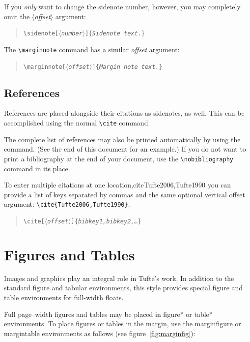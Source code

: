 \documentclass{tufte-handout}
\newcommand{\doccmd}[1]{\texttt{\textbackslash#1}}%
\newcommand{\docopt}[1]{\ensuremath{\langle}\textrm{\textit{#1}}\ensuremath{\rangle}}%
\newcommand{\docarg}[1]{\textrm{\textit{#1}}}%
\newenvironment{docspec}{\begin{quote}\noindent}{\end{quote}}%
\newcommand{\docenv}[1]{\textsf{#1}}%
\begin{document}
If you \emph{only} want to change the sidenote number, however, you may
completely omit the \docopt{offset} argument:
\begin{docspec}
  \doccmd{sidenote[\docopt{number}]\{\docarg{Sidenote text.}\}}
\end{docspec}

The \Verb|\marginnote| command has a similar \docarg{offset} argument:
\begin{docspec}
  \doccmd{marginnote[\docopt{offset}]\{\docarg{Margin note text.}\}}
\end{docspec}

\subsection{References}
References are placed alongside their citations as sidenotes,
as well.  This can be accomplished using the normal \Verb|\cite|
command.

The complete list of references may also be printed automatically by using
the \Verb|| command.  (See the end of this document for an
example.)  If you do not want to print a bibliography at the end of your
document, use the \Verb|\nobibliography| command in its place.  

To enter multiple citations at one location,cite{Tufte2006,Tufte1990} you can
provide a list of keys separated by commas and the same optional vertical
offset argument: \Verb|\cite{Tufte2006,Tufte1990}|.  
\begin{docspec}
  \doccmd{cite[\docopt{offset}]\{\docarg{bibkey1,bibkey2,\ldots}\}}
\end{docspec}

\section{Figures and Tables}\label{sec:figures-and-tables}
Images and graphics play an integral role in Tufte's work.
In addition to the standard \docenv{figure} and \docenv{tabular} environments,
this style provides special figure and table environments for full-width
floats.

Full page--width figures and tables may be placed in \docenv{figure*} or
\docenv{table*} environments.  To place figures or tables in the margin,
use the \docenv{marginfigure} or \docenv{margintable} environments as follows
(see figure~\ref{fig:marginfig}):
\end{document}
